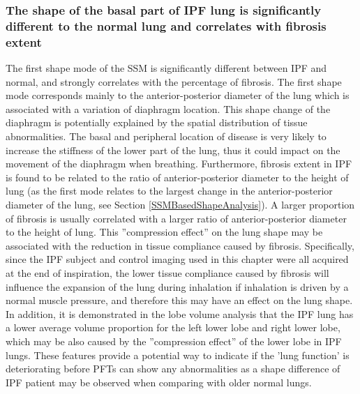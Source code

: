 \subsubsection{The shape of the basal part of IPF lung is significantly different to the normal lung and correlates with fibrosis extent}
The first shape mode of the SSM is significantly different between IPF and normal, and strongly correlates with the percentage of fibrosis. The first shape mode corresponds mainly to the anterior-posterior diameter of the lung which is associated with a variation of diaphragm location. This shape change of the diaphragm is potentially explained by the spatial distribution of tissue abnormalities. The basal and peripheral location of disease is very likely to increase the stiffness of the lower part of the lung, thus it could impact on the movement of the diaphragm when breathing. Furthermore, fibrosis extent in IPF is found to be related to the ratio of anterior-posterior diameter to the height of lung (as  the first mode relates to the largest change in the anterior-posterior diameter of the lung, see Section \ref{SSMBasedShapeAnalysis}). A larger proportion of fibrosis is usually correlated with a larger ratio of anterior-posterior diameter to the height of lung. This ''compression effect'' on the lung shape may be associated with the reduction in tissue compliance caused by fibrosis. Specifically, since the IPF subject and control imaging used in this chapter were all acquired at the end of inspiration, the lower tissue compliance caused by fibrosis will influence the expansion of the lung during inhalation if inhalation is driven by a normal muscle pressure, and therefore this may have an effect on the lung shape. In addition, it is demonstrated in the lobe volume analysis that the IPF lung has a lower average volume proportion for the left lower lobe and right lower lobe, which may be also caused by the ''compression effect'' of the lower lobe in IPF lungs. These features provide a potential way to indicate if the 'lung function' is deteriorating before PFTs can show any abnormalities as a shape difference of IPF patient may be observed when comparing with older normal lungs.

